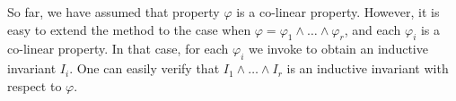 So far, we have assumed that property $\varphi$ is a co-linear property.
However, it is easy to extend the method to the case when
$\varphi=\varphi_1\land\ldots\land\varphi_r$, and each $\varphi_i$ is a
co-linear property. In that case, for each $\varphi_i$ we invoke \invariantref{}
to obtain an inductive invariant $I_i$. One can easily verify that
$I_1\land\ldots\land I_r$ is an inductive invariant with respect to $\varphi$.
